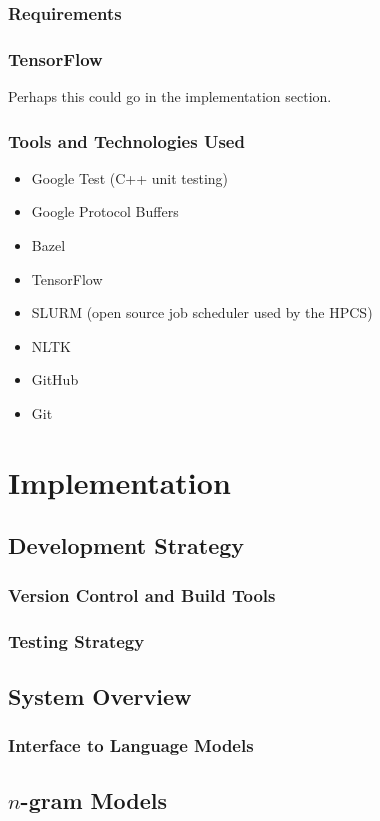 \documentclass[a4paper, 12pt]{report}
\begin{document}
\subsection{Requirements}
\subsection{TensorFlow}
Perhaps this could go in the implementation section.
\subsection{Tools and Technologies Used}
\begin{itemize}
\item
	Google Test (C++ unit testing)
\item
	Google Protocol Buffers
\item
	Bazel
\item
	TensorFlow
\item
	SLURM (open source job scheduler used by the HPCS)
\item
	NLTK
\item
	GitHub
\item
	Git
\end{itemize}

\chapter{Implementation}
\section{Development Strategy}
\subsection{Version Control and Build Tools}
\subsection{Testing Strategy}
\section{System Overview}
\subsection{Interface to Language Models}
\section{$n$-gram Models}
\end{document}
